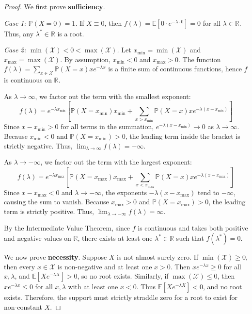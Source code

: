 \documentclass[12pt]{article}
\numberwithin{equation}{section}
\begin{document}
\begin{proof}
    We first prove \textbf{sufficiency}.
    
    \textit{Case 1: \(\mathbb{P}(X=0)=1\).} If \(X \equiv 0\), then \(f(\lambda) = \mathbb{E}[0 \cdot e^{-\lambda \cdot 0}] = 0\) for all \(\lambda \in \mathbb{R}\). Thus, any \(\lambda^* \in \mathbb{R}\) is a root.

    \textit{Case 2: \(\min(\mathcal{X}) < 0 < \max(\mathcal{X})\).} 
    Let \(x_{\min} = \min(\mathcal{X})\) and \(x_{\max} = \max(\mathcal{X})\). By assumption, \(x_{\min} < 0\) and \(x_{\max} > 0\). 
    The function \(f(\lambda) = \sum_{x \in \mathcal{X}} \mathbb{P}(X=x) x e^{-\lambda x}\) is a finite sum of continuous functions, hence \(f\) is continuous on \(\mathbb{R}\).
    
    As \(\lambda \to \infty\), we factor out the term with the smallest exponent:
    \[ f(\lambda) = e^{-\lambda x_{\min}} \left[ \mathbb{P}(X=x_{\min})x_{\min} + \sum_{x > x_{\min}} \mathbb{P}(X=x)x e^{-\lambda(x - x_{\min})} \right] \]
    Since \(x - x_{\min} > 0\) for all terms in the summation, \(e^{-\lambda(x - x_{\min})} \to 0\) as \(\lambda \to \infty\). Because \(x_{\min} < 0\) and \(\mathbb{P}(X=x_{\min}) > 0\), the leading term inside the bracket is strictly negative. Thus, \(\lim_{\lambda \to \infty} f(\lambda) = -\infty\).

    As \(\lambda \to -\infty\), we factor out the term with the largest exponent:
    \[ f(\lambda) = e^{-\lambda x_{\max}} \left[ \mathbb{P}(X=x_{\max})x_{\max} + \sum_{x < x_{\max}} \mathbb{P}(X=x)x e^{-\lambda(x - x_{\max})} \right] \]
    Since \(x - x_{\max} < 0\) and \(\lambda \to -\infty\), the exponents \(-\lambda(x - x_{\max})\) tend to \(-\infty\), causing the sum to vanish. Because \(x_{\max} > 0\) and \(\mathbb{P}(X=x_{\max}) > 0\), the leading term is strictly positive. Thus, \(\lim_{\lambda \to -\infty} f(\lambda) = \infty\).
    
    By the Intermediate Value Theorem, since \(f\) is continuous and takes both positive and negative values on \(\mathbb{R}\), there exists at least one \(\lambda^* \in \mathbb{R}\) such that \(f(\lambda^*) = 0\).

    We now prove \textbf{necessity}.
    Suppose \(X\) is not almost surely zero. If \(\min(\mathcal{X}) \geq 0\), then every \(x \in \mathcal{X}\) is non-negative and at least one \(x > 0\). Then \(x e^{-\lambda x} \geq 0\) for all \(x, \lambda\), and \(\mathbb{E}[X e^{-\lambda X}] > 0\), so no root exists. Similarly, if \(\max(\mathcal{X}) \leq 0\), then \(x e^{-\lambda x} \leq 0\) for all \(x, \lambda\) with at least one \(x < 0\). Thus \(\mathbb{E}[X e^{-\lambda X}] < 0\), and no root exists. Therefore, the support must strictly straddle zero for a root to exist for non-constant \(X\).
\end{proof}
\end{document}
